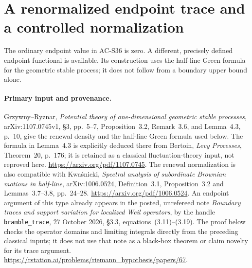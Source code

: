 \section{A renormalized endpoint trace and a controlled normalization}
\label{sec:spectral-renormalized-boundary}

The ordinary endpoint value in AC-S36 is zero.  A different,
precisely defined endpoint functional is available.  Its construction
uses the half-line Green formula for the geometric stable process;
it does not follow from a boundary upper bound alone.

\paragraph{Primary input and provenance.}
Grzywny--Ryznar, \emph{Potential theory of one-dimensional geometric
stable processes}, arXiv:1107.0745v1, \S3, pp.~5--7,
Proposition~3.2, Remark~3.6, and Lemma~4.3, p.~10,
give the renewal density and the half-line Green formula used below.
The formula in Lemma~4.3 is explicitly deduced there from Bertoin,
\emph{Levy Processes}, Theorem~20, p.~176; it is retained as a classical
fluctuation-theory input, not reproved here.
\url{https://arxiv.org/pdf/1107.0745}.
The renewal normalization is also compatible with Kwa\'snicki,
\emph{Spectral analysis of subordinate Brownian motions in half-line},
arXiv:1006.0524, Definition~3.1, Proposition~3.2 and
Lemmas~3.7--3.8, pp.~24--28.
\url{https://arxiv.org/pdf/1006.0524}.
An endpoint argument of this type already appears in the posted,
unrefereed note \emph{Boundary traces and support variation for
localized Weil operators}, by the handle \texttt{bramble\_trace},
27 October 2026, \S3.3, equations~(3.11)--(3.19).
The proof below checks the operator domains and limiting integrals
directly from the preceding classical inputs; it does not use that
note as a black-box theorem or claim novelty for its trace argument.
\url{https://rstation.ai/problems/riemann_hypothesis/papers/67}.


